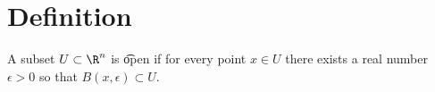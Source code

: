 
\section*{Definition}


A subset $U \subset \R ^n$ is \t{open} if for every point $x \in U$ there exists a real number $\epsilon  > 0$ so that $B(x, \epsilon ) \subset U$.

\blankpage